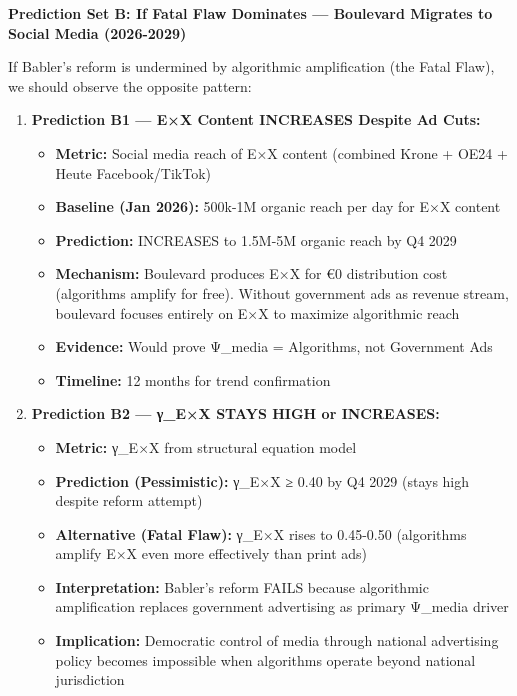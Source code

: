 \textbf{Prediction Set B: If Fatal Flaw Dominates — Boulevard Migrates to Social Media (2026-2029)}

If Babler's reform is undermined by algorithmic amplification (the Fatal Flaw), we should observe
the opposite pattern:

\begin{enumerate}

\item \textbf{Prediction B1 — E×X Content INCREASES Despite Ad Cuts:}
  \begin{itemize}
  \item \textbf{Metric:} Social media reach of E×X content (combined Krone + OE24 + Heute Facebook/TikTok)
  \item \textbf{Baseline (Jan 2026):} 500k-1M organic reach per day for E×X content
  \item \textbf{Prediction:} INCREASES to 1.5M-5M organic reach by Q4 2029
  \item \textbf{Mechanism:} Boulevard produces E×X for €0 distribution cost (algorithms amplify
    for free). Without government ads as revenue stream, boulevard focuses entirely on E×X
    to maximize algorithmic reach
  \item \textbf{Evidence:} Would prove Ψ_media = Algorithms, not Government Ads
  \item \textbf{Timeline:} 12 months for trend confirmation
  \end{itemize}

\item \textbf{Prediction B2 — γ_{E×X} STAYS HIGH or INCREASES:}
  \begin{itemize}
  \item \textbf{Metric:} γ_{E×X} from structural equation model
  \item \textbf{Prediction (Pessimistic):} γ_{E×X} ≥ 0.40 by Q4 2029 (stays high despite reform attempt)
  \item \textbf{Alternative (Fatal Flaw):} γ_{E×X} rises to 0.45-0.50 (algorithms amplify E×X
    even more effectively than print ads)
  \item \textbf{Interpretation:} Babler's reform FAILS because algorithmic amplification replaces
    government advertising as primary Ψ_media driver
  \item \textbf{Implication:} Democratic control of media through national advertising policy
    becomes impossible when algorithms operate beyond national jurisdiction
  \end{itemize}


\end{enumerate}

